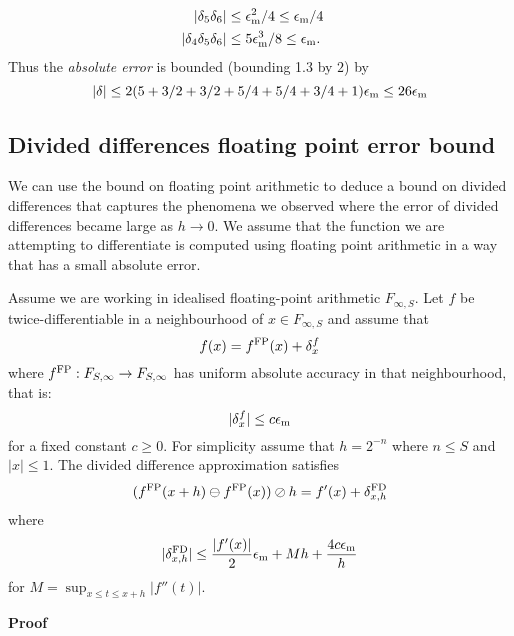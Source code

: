 \begin{example}
\begin{align*}
|\ensuremath{\delta}_5 \ensuremath{\delta}_6| &\ensuremath{\leq}  \ensuremath{\epsilon}_{\rm m}^2/4  \ensuremath{\leq} \ensuremath{\epsilon}_{\rm m}/4 \cr
|\ensuremath{\delta}_4\ensuremath{\delta}_5\ensuremath{\delta}_6| &\ensuremath{\leq} 5\ensuremath{\epsilon}_{\rm m}^3/8 \ensuremath{\leq} \ensuremath{\epsilon}_{\rm m}.
\end{align*}
Thus the \emph{absolute error} is bounded (bounding 1.3 by $2$) by
\[
|\ensuremath{\delta}| \ensuremath{\leq} 2 (5 +  3/2 + 3/2 + 5/4 + 5/4 + 3/4 + 1) \ensuremath{\epsilon}_{\rm m} \ensuremath{\leq} 26 \ensuremath{\epsilon}_{\rm m}
\]
\end{example}

\subsection{Divided differences floating point error bound}
We can use the bound on floating point arithmetic to deduce a bound on divided differences that captures the phenomena we observed where the error of divided differences became large as $h \ensuremath{\rightarrow} 0$. We assume that the function we are attempting to differentiate is computed using floating point arithmetic in a way that has a small absolute error.

\begin{theorem} Assume we are working in idealised floating-point arithmetic $F_{\ensuremath{\infty},S}$. Let $f$ be twice-differentiable in a neighbourhood of $x \ensuremath{\in} F_{\ensuremath{\infty},S}$ and assume that
\[
 f(x) = f^{\rm FP}(x) + \ensuremath{\delta}_x^f
\]
where $f^{\rm FP} : F_{S,\ensuremath{\infty}} \ensuremath{\rightarrow} F_{S,\ensuremath{\infty}}$ has uniform absolute accuracy in that neighbourhood, that is:
\[
|\ensuremath{\delta}_x^f| \ensuremath{\leq} c \ensuremath{\epsilon}_{\rm m}
\]
for a fixed constant $c \ensuremath{\geq} 0$. For simplicity assume that $h = 2^{-n}$ where $n \ensuremath{\leq} S$ and $|x| \ensuremath{\leq} 1$. The divided difference approximation satisfies
\[
(f^{\rm FP}(x + h) \ensuremath{\ominus} f^{\rm FP}(x)) \ensuremath{\oslash} h = f'(x) + \ensuremath{\delta}_{x,h}^{\rm FD}
\]
where
\[
|\ensuremath{\delta}_{x,h}^{\rm FD}| \ensuremath{\leq} {|f'(x)| \over 2} \ensuremath{\epsilon}_{\rm m} + M h +  {4c \ensuremath{\epsilon}_{\rm m} \over h}
\]
for $M = \sup_{x \ensuremath{\leq} t \ensuremath{\leq} x+h} |f''(t)|$.

\end{theorem}
\textbf{Proof}

